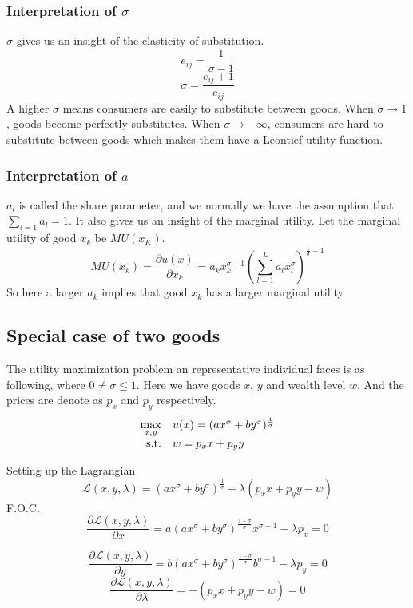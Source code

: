 \subsubsection{Interpretation of $\sigma$}
$\sigma$ gives us an insight of the elasticity of substitution.
$$e_{ij} = \dfrac{1}{\sigma-1}$$
$$\sigma = \dfrac{e_{ij}+1}{e_{ij}}$$
A higher $\sigma$ means consumers are easily to substitute between goods. When $\sigma \to 1$, goods become perfectly substitutes. When $\sigma \to -\infty$, consumers are hard to substitute between goods which makes them have a Leontief utility function.
\subsubsection{Interpretation of $a$}
$a_l$ is called the share parameter, and we normally we have the assumption that $\sum_{l=1}a_{l}=1$. It also gives us an insight of the marginal utility. Let the marginal utility of good $x_k$ be $MU(x_K)$.
$$MU(x_k) = \dfrac{\partial u(x)}{\partial x_k} = a_kx_k^{\sigma-1}\left(\sum_{l=1}^{L}a_lx_l^\sigma\right)^{\frac{1}{\sigma}-1}$$
So here a larger $a_k$ implies that good $x_k$ has a larger marginal utility
\subsection{Special case of two goods}
The utility maximization problem an representative individual faces is as following, where $0 \neq \sigma \leq 1 $. Here we have goods $x$, $y$ and wealth level $w$. And the prices are denote as $p_x$ and $p_y$ respectively.
\begin{equation}
\begin{array}{rlclcl}
\displaystyle \max_{x,y} & \multicolumn{3}{l}{u(x)=(ax^\sigma+by^\sigma)^{\frac{1}{\sigma}}}\\
\textrm{s.t.} & w=p_{x}x+p_{y}y
\end{array}
\end{equation}

Setting up the Lagrangian
\begin{equation}
\mathcal{L}(x,y,\lambda)=(ax^\sigma+by^\sigma)^{\frac{1}{\sigma}}-\lambda(p_{x}x+p_{y}y-w)
\end{equation}
F.O.C.
\begin{equation}
\frac{\partial \mathcal{L}(x,y,\lambda)}{\partial x} =a(ax^\sigma+by^\sigma)^{\frac{1-\sigma}{\sigma}}x^{\sigma-1}-\lambda p_{x}=0
\end{equation}

\begin{equation}
\frac{\partial \mathcal{L}(x,y,\lambda)}{\partial y} =b(ax^\sigma+by^\sigma)^{\frac{1-\sigma}{\sigma}}b^{\sigma-1}-\lambda p_{y}=0
\end{equation}
\begin{equation}
\frac{\partial \mathcal{L}(x,y,\lambda)}{\partial \lambda} =-(p_{x}x+p_{y}y-w)=0
\end{equation}

